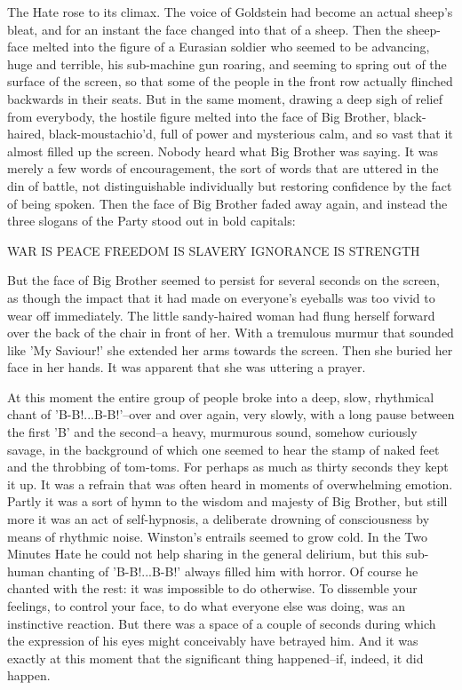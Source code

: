 \documentclass{article}
\begin{document}
The Hate rose to its climax. The voice of Goldstein had become an actual
sheep's bleat, and for an instant the face changed into that of a sheep.
Then the sheep-face melted into the figure of a Eurasian soldier who seemed
to be advancing, huge and terrible, his sub-machine gun roaring, and
seeming to spring out of the surface of the screen, so that some of the
people in the front row actually flinched backwards in their seats. But
in the same moment, drawing a deep sigh of relief from everybody, the
hostile figure melted into the face of Big Brother, black-haired,
black-moustachio'd, full of power and mysterious calm, and so vast that
it almost filled up the screen. Nobody heard what Big Brother was saying.
It was merely a few words of encouragement, the sort of words that are
uttered in the din of battle, not distinguishable individually but
restoring confidence by the fact of being spoken. Then the face of Big
Brother faded away again, and instead the three slogans of the Party stood
out in bold capitals:


  WAR IS PEACE
  FREEDOM IS SLAVERY
  IGNORANCE IS STRENGTH


But the face of Big Brother seemed to persist for several seconds on the
screen, as though the impact that it had made on everyone's eyeballs was
too vivid to wear off immediately. The little sandy-haired woman had flung
herself forward over the back of the chair in front of her. With a
tremulous murmur that sounded like 'My Saviour!' she extended her arms
towards the screen. Then she buried her face in her hands. It was apparent
that she was uttering a prayer.

At this moment the entire group of people broke into a deep, slow,
rhythmical chant of 'B-B!...B-B!'--over and over again, very slowly, with a
long pause between the first 'B' and the second--a heavy, murmurous sound,
somehow curiously savage, in the background of which one seemed to hear the
stamp of naked feet and the throbbing of tom-toms. For perhaps as much as
thirty seconds they kept it up. It was a refrain that was often heard in
moments of overwhelming emotion. Partly it was a sort of hymn to the wisdom
and majesty of Big Brother, but still more it was an act of self-hypnosis,
a deliberate drowning of consciousness by means of rhythmic noise.
Winston's entrails seemed to grow cold. In the Two Minutes Hate he could
not help sharing in the general delirium, but this sub-human chanting of
'B-B!...B-B!' always filled him with horror. Of course he chanted with the
rest: it was impossible to do otherwise. To dissemble your feelings, to
control your face, to do what everyone else was doing, was an instinctive
reaction. But there was a space of a couple of seconds during which the
expression of his eyes might conceivably have betrayed him. And it was
exactly at this moment that the significant thing happened--if, indeed,
it did happen.
\end{document}
